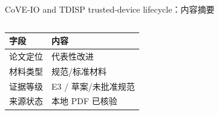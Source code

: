\begin{frame}[t,shrink=6]{CoVE-IO and TDISP trusted-device lifecycle：内容摘要}
\begin{columns}[T,totalwidth=\textwidth]
\begin{column}{0.49\textwidth}
{\begin{minipage}[t]{0.97\linewidth}
\begin{minipage}{0.92\linewidth}
      \scriptsize {\tiny
\begin{tabularx}{\linewidth}{@{}YY@{}}
\toprule
\textbf{字段} & \textbf{内容} \\
\midrule
论文定位 & 代表性改进 \\
材料类型 & 规范/标准材料 \\
证据等级 & E3 / 草案/未批准规范 \\
来源状态 & 本地 PDF 已核验 \\
\bottomrule
\end{tabularx}
}
    \end{minipage}
    \vspace{1mm}
  \end{minipage}}
  \end{column}
\end{columns}
\end{frame}


